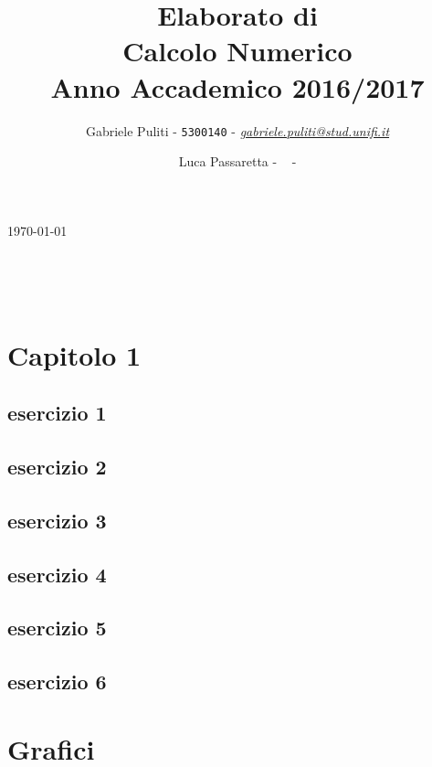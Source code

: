 \documentclass[11pt]{extarticle}
\title{\vspace{2cm}Elaborato di\\ \textbf{Calcolo Numerico}\\ Anno Accademico 2016/2017\vspace{1cm}}
\author{Gabriele Puliti - \texttt{5300140} - \href{mailto:gabriele.puliti@stud.unifi.it}{\textit{gabriele.puliti@stud.unifi.it}}
\and Luca Passaretta - \texttt{ } - \href{mailto: }{\textit{ }}}
\date{}
\begin{document}
\maketitle

\begin{center}
\today{}
\end{center}

\newpage
\
\newpage

\tableofcontents
\newpage
\
\newpage

\section{\textbf{Capitolo 1}}
\subsection{esercizio 1}

\subsection{esercizio 2}

\subsection{esercizio 3}

\subsection{esercizio 4}

\subsection{esercizio 5}

\subsection{esercizio 6}


\newpage
{}
\section{\textbf{Grafici}}
\end{document}
